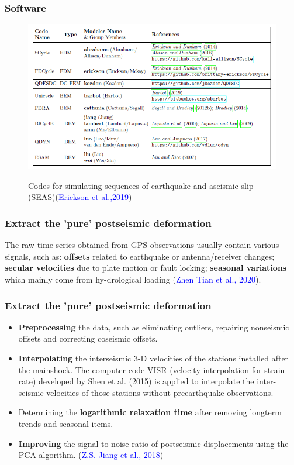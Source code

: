 ﻿\documentclass{beamer}
\begin{document}
\begin{frame}
\frametitle{Software}
\begin{figure}
  \centering
  \includegraphics[scale=0.5]{./pic/soft2.png}\\
  \caption{Codes for simulating sequences of earthquake and aseismic slip (SEAS)(\textcolor{blue}{Erickson et al.,2019})}\label{fig_okada}
\end{figure}

\end{frame}


\begin{frame}
\frametitle{\textbf{Extract} the 'pure' postseismic deformation}
The raw time series obtained from GPS observations usually contain various signals, such as: \textbf{offsets} related to earthquake or antenna/receiver changes; \textbf{secular velocities} due to plate motion or fault locking; \textbf{seasonal variations} which mainly come from hy-drological loading (\textcolor{blue}{Zhen Tian et al., 2020}).


\end{frame}

\begin{frame}
\frametitle{\textbf{Extract} the 'pure' postseismic deformation}
\small{
\begin{itemize}
  \item \textbf{Preprocessing} the data, such as eliminating outliers, repairing nonseismic offsets and correcting coseismic offsets.
  \item \textbf{Interpolating} the interseismic 3-D velocities of the stations installed after the mainshock. The computer code VISR (velocity interpolation for strain rate) developed by Shen et al. (2015) is applied to interpolate the inter-seismic velocities of those stations without preearthquake observations.
  \item Determining the \textbf{logarithmic relaxation time} after removing longterm
trends and seasonal items.
  \item \textbf{Improving} the signal-to-noise ratio of postseismic displacements
using the PCA algorithm. (\textcolor{blue}{Z.S. Jiang et al., 2018})
\end{itemize}

}

\end{frame}
\end{document}
